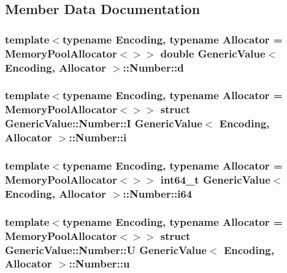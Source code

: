 \subsection{Member Data Documentation}
\subsubsection[{\texorpdfstring{d}{d}}]{\setlength{\rightskip}{0pt plus 5cm}template$<$typename Encoding, typename Allocator = Memory\+Pool\+Allocator$<$$>$$>$ double {\bf Generic\+Value}$<$ Encoding, Allocator $>$\+::Number\+::d}\hypertarget{unionGenericValue_1_1Number_a7ca3ad492fff303586d241eb0d17c242}{}\label{unionGenericValue_1_1Number_a7ca3ad492fff303586d241eb0d17c242}
\subsubsection[{\texorpdfstring{i}{i}}]{\setlength{\rightskip}{0pt plus 5cm}template$<$typename Encoding, typename Allocator = Memory\+Pool\+Allocator$<$$>$$>$ struct {\bf Generic\+Value\+::\+Number\+::I} {\bf Generic\+Value}$<$ Encoding, Allocator $>$\+::Number\+::i}\hypertarget{unionGenericValue_1_1Number_a0593fffc72a240979606668179e94436}{}\label{unionGenericValue_1_1Number_a0593fffc72a240979606668179e94436}
\subsubsection[{\texorpdfstring{i64}{i64}}]{\setlength{\rightskip}{0pt plus 5cm}template$<$typename Encoding, typename Allocator = Memory\+Pool\+Allocator$<$$>$$>$ {\bf int64\+\_\+t} {\bf Generic\+Value}$<$ Encoding, Allocator $>$\+::Number\+::i64}\hypertarget{unionGenericValue_1_1Number_ae53d96a8ead92099541da3b71633b77b}{}\label{unionGenericValue_1_1Number_ae53d96a8ead92099541da3b71633b77b}
\subsubsection[{\texorpdfstring{u}{u}}]{\setlength{\rightskip}{0pt plus 5cm}template$<$typename Encoding, typename Allocator = Memory\+Pool\+Allocator$<$$>$$>$ struct {\bf Generic\+Value\+::\+Number\+::U} {\bf Generic\+Value}$<$ Encoding, Allocator $>$\+::Number\+::u}\hypertarget{unionGenericValue_1_1Number_a3b5f0986718c830b88d641491248131d}{}\label{unionGenericValue_1_1Number_a3b5f0986718c830b88d641491248131d}
